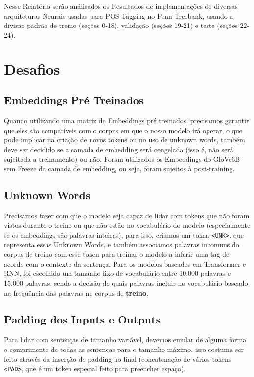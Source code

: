 \documentclass[a4paper,12pt]{article}
\begin{document}
Nesse Relatório serão análisados os Resultados de implementações de diversas arquiteturas Neurais usadas para POS Tagging no Penn Treebank, usando a divisão padrão de treino (seções 0-18), validação (seções 19-21) e teste (seções 22-24).

\section{Desafios}

\subsection{Embeddings Pré Treinados}
Quando utilizando uma matriz de Embeddings pré treinados, precisamos garantir que eles são compatíveis com o corpus em que o nosso modelo irá operar, o que pode implicar na criação de novos tokens ou no uso de unknown words, também deve ser decidido se a camada de embedding será congelada (isso é, não será sujeitada a treinamento) ou não. Foram utilizados os Embeddings do GloVe6B sem Freeze da camada de embedding, ou seja, foram sujeitos à post-training.

\subsection{Unknown Words}
Precisamos fazer com que o modelo seja capaz de lidar com tokens que não foram vistos durante o treino ou que não estão no vocabulário do modelo (especialmente se os embeddings são palavras inteiras), para isso, criamos um token \texttt{<UNK>}, que representa essas Unknown Words, e também associamos palavras incomuns do corpus de treino com esse token para treinar o modelo a inferir uma tag de acordo com o contexto da sentença. Para os modelos baseados em Transformer e RNN, foi escolhido um tamanho fixo de vocabulário entre 10.000 palavras e 15.000 palavras, sendo a decisão de quais palavras incluir no vocabulário baseado na frequência das palavras no corpus de \textbf{treino}.

\subsection{Padding dos Inputs e Outputs}
Para lidar com sentenças de tamanho variável, devemos emular de alguma forma o comprimento de todas as sentenças para o tamanho máximo, isso costuma ser feito através da inserção de padding no final (concatenação de vários tokens \texttt{<PAD>}, que é um token especial feito para preencher espaço).
\end{document}
